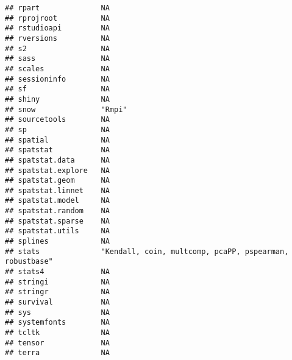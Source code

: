 \documentclass[
]{article}
\begin{document}
\begin{verbatim}
## rpart              NA                                                     
## rprojroot          NA                                                     
## rstudioapi         NA                                                     
## rversions          NA                                                     
## s2                 NA                                                     
## sass               NA                                                     
## scales             NA                                                     
## sessioninfo        NA                                                     
## sf                 NA                                                     
## shiny              NA                                                     
## snow               "Rmpi"                                                 
## sourcetools        NA                                                     
## sp                 NA                                                     
## spatial            NA                                                     
## spatstat           NA                                                     
## spatstat.data      NA                                                     
## spatstat.explore   NA                                                     
## spatstat.geom      NA                                                     
## spatstat.linnet    NA                                                     
## spatstat.model     NA                                                     
## spatstat.random    NA                                                     
## spatstat.sparse    NA                                                     
## spatstat.utils     NA                                                     
## splines            NA                                                     
## stats              "Kendall, coin, multcomp, pcaPP, pspearman, robustbase"
## stats4             NA                                                     
## stringi            NA                                                     
## stringr            NA                                                     
## survival           NA                                                     
## sys                NA                                                     
## systemfonts        NA                                                     
## tcltk              NA                                                     
## tensor             NA                                                     
## terra              NA                                                     

\end{verbatim}
\end{document}
